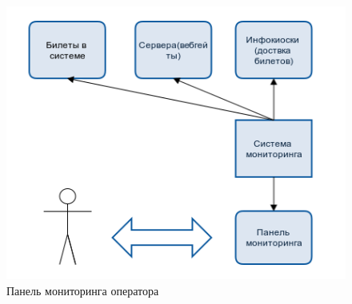 \begin{figure}[H]
  	\centering
 	\includegraphics[width=1\textwidth]{images/panel.png}
  	\caption{Панель мониторинга оператора}
    \label{fig:panel.png}
\end{figure}




























\newpage